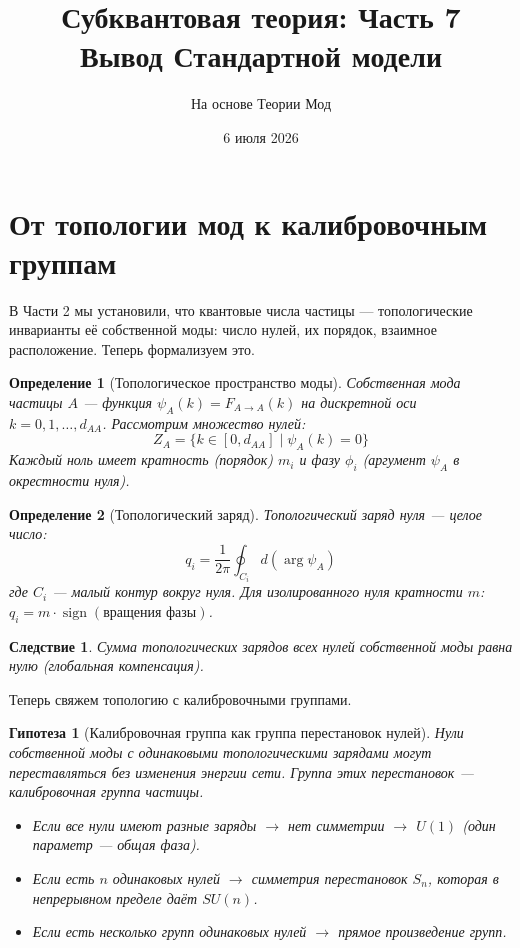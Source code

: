 \documentclass[11pt,a4paper]{article}
\title{Субквантовая теория: Часть 7 \\ Вывод Стандартной модели}
\author{На основе Теории Мод}
\date{6 июля 2026}
\newtheorem{definition}{Определение}[section]
\newtheorem{corollary}{Следствие}[section]
\newtheorem{hypothesis}{Гипотеза}[section]
\theoremstyle{definition}
\begin{document}
\maketitle
\tableofcontents
\newpage

\section{От топологии мод к калибровочным группам}

В Части 2 мы установили, что квантовые числа частицы — топологические инварианты её собственной моды: число нулей, их порядок, взаимное расположение. Теперь формализуем это.

\begin{definition}[Топологическое пространство моды]
Собственная мода частицы $A$ — функция $\psi_A(k) = F_{A \to A}(k)$ на дискретной оси $k = 0, 1, \dots, d_{AA}$. Рассмотрим множество нулей:
\begin{equation}
    Z_A = \{k \in [0, d_{AA}] \mid \psi_A(k) = 0\}
\end{equation}
Каждый ноль имеет кратность (порядок) $m_i$ и фазу $\phi_i$ (аргумент $\psi_A$ в окрестности нуля).
\end{definition}

\begin{definition}[Топологический заряд]
Топологический заряд нуля — целое число:
\begin{equation}
    q_i = \frac{1}{2\pi} \oint_{C_i} d(\arg \psi_A)
\end{equation}
где $C_i$ — малый контур вокруг нуля. Для изолированного нуля кратности $m$: $q_i = m \cdot \operatorname{sign}(\text{вращения фазы})$.
\end{definition}

\begin{corollary}
Сумма топологических зарядов всех нулей собственной моды равна нулю (глобальная компенсация).
\end{corollary}

Теперь свяжем топологию с калибровочными группами.

\begin{hypothesis}[Калибровочная группа как группа перестановок нулей]
Нули собственной моды с одинаковыми топологическими зарядами могут переставляться без изменения энергии сети. Группа этих перестановок — калибровочная группа частицы.
\begin{itemize}
    \item Если все нули имеют разные заряды $\to$ нет симметрии $\to$ $U(1)$ (один параметр — общая фаза).
    \item Если есть $n$ одинаковых нулей $\to$ симметрия перестановок $S_n$, которая в непрерывном пределе даёт $SU(n)$.
    \item Если есть несколько групп одинаковых нулей $\to$ прямое произведение групп.
\end{itemize}
\end{hypothesis}
\end{document}
